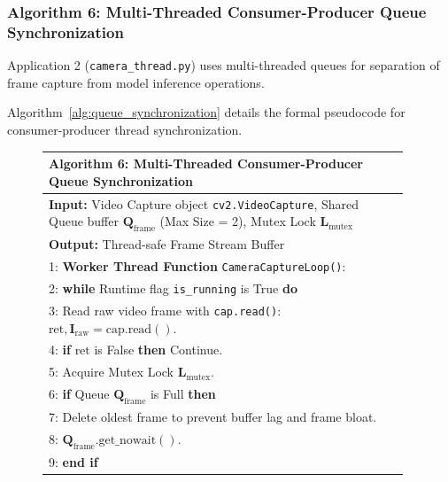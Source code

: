 \subsubsection{Algorithm 6: Multi-Threaded Consumer-Producer Queue Synchronization}
Application 2 (\texttt{camera\_thread.py}) uses multi-threaded queues for separation of frame capture from model inference operations.

Algorithm~\ref{alg:queue_synchronization} details the formal pseudocode for consumer-producer thread synchronization.

\begin{figure}[htbp]
\centering
\begin{minipage}{0.92\textwidth}
\small
\setlength{\extrarowheight}{2pt}
\begin{tabular}{|p{0.96\linewidth}|}
\hline
\textbf{Algorithm 6: Multi-Threaded Consumer-Producer Queue Synchronization} \\
\hline
{\small\sffamily \textbf{Input:} Video Capture object \texttt{cv2.VideoCapture}, Shared Queue buffer $\mathbf{Q}_{\text{frame}}$ (Max Size = 2), Mutex Lock $\mathbf{L}_{\text{mutex}}$} \\
{\small\sffamily \textbf{Output:} Thread-safe Frame Stream Buffer} \\
{\small 1: \textbf{Worker Thread Function} \texttt{CameraCaptureLoop()}:} \\
{\small 2: \textbf{while} Runtime flag \texttt{is\_running} is True \textbf{do}} \\
{\small 3: \hspace{1em} Read raw video frame with \texttt{cap.read()}: $\text{ret}, \mathbf{I}_{\text{raw}} = \text{cap.read}()$.} \\
{\small 4: \hspace{1em} \textbf{if} $\text{ret}$ is False \textbf{then} Continue.} \\
{\small 5: \hspace{1em} Acquire Mutex Lock $\mathbf{L}_{\text{mutex}}$.} \\
{\small 6: \hspace{1em} \textbf{if} Queue $\mathbf{Q}_{\text{frame}}$ is Full \textbf{then}} \\
{\small 7: \hspace{2em} Delete oldest frame to prevent buffer lag and frame bloat.} \\
{\small 8: \hspace{2em} $\mathbf{Q}_{\text{frame}}.\text{get\_nowait}()$.} \\
{\small 9: \hspace{1em} \textbf{end if}} \\

\end{tabular}
\end{minipage}
\end{figure}
